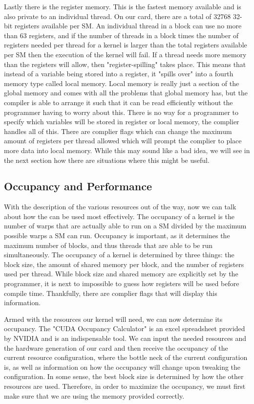 \documentclass[12pt]{report}
\begin{document}
Lastly there is the register memory. This is the fastest memory available and is also private to an individual thread. On our card, there are a total of 32768 32-bit registers available per SM. An individual thread in a block can use no more than 63 registers, and if the number of threads in a block times the number of registers needed per thread for a kernel is larger than the total registers available per SM then the execution of the kernel will fail. If a thread needs more memory than the registers will allow, then "register-spilling" takes place. This means that instead of a variable being stored into a register, it "spills over" into a fourth memory type called local memory. Local memory is really just a section of the global memory and comes with all the problems that global memory has, but the compiler is able to arrange it such that it can be read efficiently without the programmer having to worry about this. There is no way for a programmer to specify which variables will be stored in register or local memory, the complier handles all of this. There are complier flags which can change the maximum amount of registers per thread allowed which will prompt the complier to place more data into local memory. While this may sound like a bad idea, we will see in the next section how there are situations where this might be useful.

\subsection{Occupancy and Performance}
\label{sec:gpuocc}
With the description of the various resources out of the way, now we can talk about how the can be used most effectively. The occupancy of a kernel is the number of warps that are actually able to run on a SM divided by the maximum possible warps a SM can run. Occupancy is important, as it determines the maximum number of blocks, and thus threads that are able to be run simultaneously. The occupancy of a kernel is determined by three things: the block size, the amount of shared memory per block, and the number of registers used per thread. While block size and shared memory are explicitly set by the programmer, it is next to impossible to guess how registers will be used before compile time. Thankfully, there are complier flags that will display this information.

Armed with the resources our kernel will need, we can now determine its occupancy. The "CUDA Occupancy Calculator" is an excel spreadsheet provided by NVIDIA and is an indispensable tool. We can input the needed resources and the hardware generation of our card and then receive the occupancy of the current resource configuration, where the bottle neck of the current configuration is, as well as information on how the occupancy will change upon tweaking the configuration. In some sense, the best block size is determined by how the other resources are used. Therefore, in order to maximize the occupancy, we must first make sure that we are using the memory provided correctly.
\end{document}
